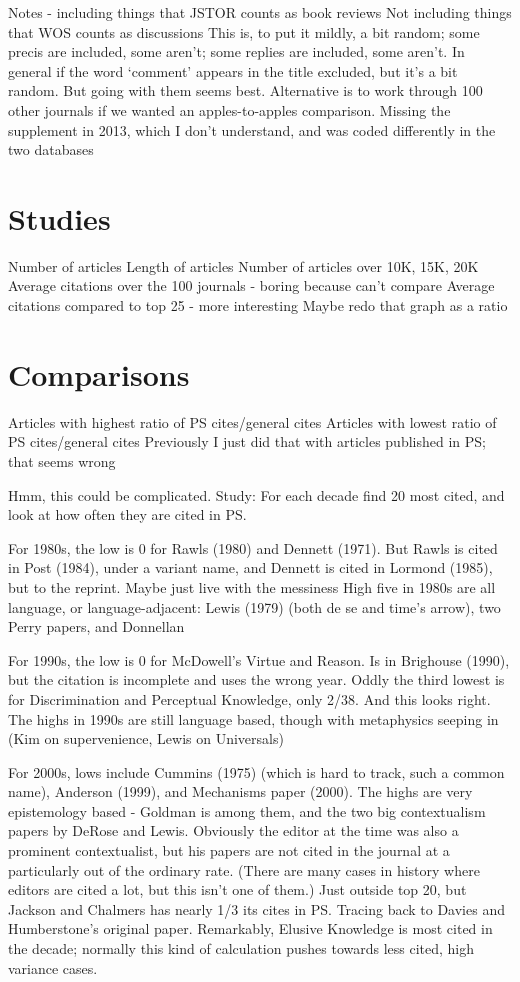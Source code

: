 \documentclass[
  10pt,
  letterpaper,
  DIV=11,
  numbers=noendperiod,
  twoside]{scrartcl}
\begin{document}
Notes - including things that JSTOR counts as book reviews Not including
things that WOS counts as discussions This is, to put it mildly, a bit
random; some precis are included, some aren't; some replies are
included, some aren't. In general if the word `comment' appears in the
title excluded, but it's a bit random. But going with them seems best.
Alternative is to work through 100 other journals if we wanted an
apples-to-apples comparison. Missing the supplement in 2013, which I
don't understand, and was coded differently in the two databases

\section{Studies}\label{studies}

Number of articles Length of articles Number of articles over 10K, 15K,
20K Average citations over the 100 journals - boring because can't
compare Average citations compared to top 25 - more interesting Maybe
redo that graph as a ratio

\section{Comparisons}\label{comparisons}

Articles with highest ratio of PS cites/general cites Articles with
lowest ratio of PS cites/general cites Previously I just did that with
articles published in PS; that seems wrong

Hmm, this could be complicated. Study: For each decade find 20 most
cited, and look at how often they are cited in PS.

For 1980s, the low is 0 for Rawls (1980) and Dennett (1971). But Rawls
is cited in Post (1984), under a variant name, and Dennett is cited in
Lormond (1985), but to the reprint. Maybe just live with the messiness
High five in 1980s are all language, or language-adjacent: Lewis (1979)
(both de se and time's arrow), two Perry papers, and Donnellan

For 1990s, the low is 0 for McDowell's Virtue and Reason. Is in
Brighouse (1990), but the citation is incomplete and uses the wrong
year. Oddly the third lowest is for Discrimination and Perceptual
Knowledge, only 2/38. And this looks right. The highs in 1990s are still
language based, though with metaphysics seeping in (Kim on
supervenience, Lewis on Universals)

For 2000s, lows include Cummins (1975) (which is hard to track, such a
common name), Anderson (1999), and Mechanisms paper (2000). The highs
are very epistemology based - Goldman is among them, and the two big
contextualism papers by DeRose and Lewis. Obviously the editor at the
time was also a prominent contextualist, but his papers are not cited in
the journal at a particularly out of the ordinary rate. (There are many
cases in history where editors are cited a lot, but this isn't one of
them.) Just outside top 20, but Jackson and Chalmers has nearly 1/3 its
cites in PS. Tracing back to Davies and Humberstone's original paper.
Remarkably, Elusive Knowledge is most cited in the decade; normally this
kind of calculation pushes towards less cited, high variance cases.
\end{document}
